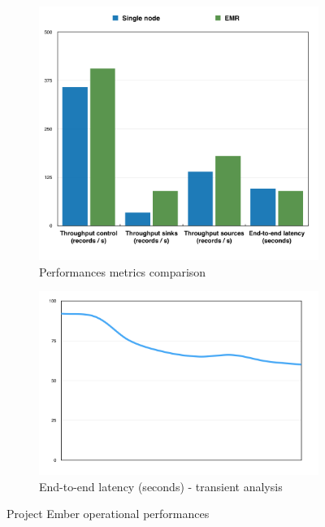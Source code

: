 \begin{figure}
\begin{subfigure}{.5\textwidth}
	\centering
	\includegraphics[scale=0.50]{img/ember_chart}
	\caption{Performances metrics comparison}
	\label{fig:ember_chart}
\end{subfigure}

\begin{subfigure}{.5\textwidth}
	\centering
	\includegraphics[scale=0.50]{img/ember_chart_latency}
	\caption{End-to-end latency (seconds) - transient analysis}
	\label{fig:ember_chart_latency}
\end{subfigure}
\caption{Project Ember operational performances}
\label{fig:ember_metrics}
\end{figure}

